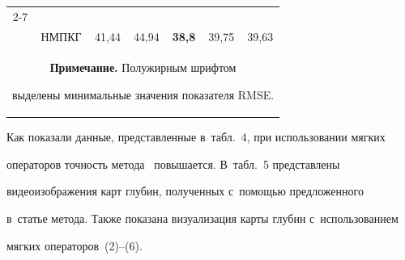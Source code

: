 \begin{table}
\begin{center}
\begin{tabular}{|c|c|c|c|c|c|c|}
\cline{2-7}


&&&&&&\\[-9pt]


&НМПКГ&41,44&44,94&\textbf{38,8}&39,75&39,63\\


\hline


  \multicolumn{7}{p{118mm}}{\footnotesize \hspace*{3mm}\textbf{Примечание.} Полужирным шрифтом 


выделены минимальные значения показателя RMSE.}


  \end{tabular}


  \end{center}


  \vspace*{-12pt}


  \end{table}


  


  Как показали данные, представленные в~табл.~4, при использовании мягких 


операторов точность метода~\cite{8-bob} повышается. В~табл.~5 представлены 


ви\-део\-изоб\-ра\-же\-ния карт глубин, полученных с~помощью предложенного 


в~статье метода. Также показана визуализация карты глубин с~использованием 


мягких операторов~(2)--(6).





